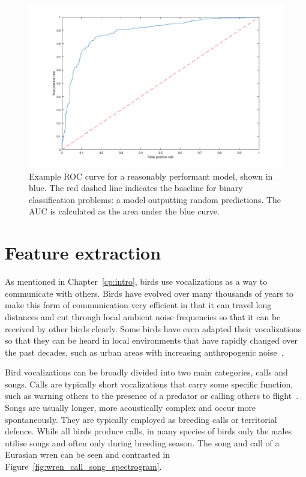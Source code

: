 \begin{figure}[ht]
  \centering
  \includegraphics[width=\textwidth]{figures/roc.png}
  \caption{Example ROC curve for a reasonably performant model, shown in blue.
  The red dashed line indicates the baseline for binary classification problems:
a model outputting random predictions. The AUC is calculated as the area under
the blue curve.}\label{fig:roc}
\end{figure}

\section{Feature extraction}\label{sec:feat_extraction}

As mentioned in Chapter~\ref{cp:intro}, birds use vocalizations as a way to
communicate with others. Birds have evolved over many thousands of years to
make this form of communication very efficient in that it can travel long
distances and cut through local ambient noise frequencies so that it can be
received by other birds clearly. Some birds have even adapted their
vocalizations so that they can be heard in local environments that have rapidly
changed over the past decades, such as urban areas with increasing anthropogenic
noise~\cite{luther2010urban}.

Bird vocalizations can be broadly divided into two main categories, calls and
songs. Calls are typically short vocalizations that carry some specific
function, such as warning others to the presence of a predator or calling others
to flight~\cite{MARLER2004132}. Songs are usually longer, more acoustically
complex and occur more spontaneously. They are typically employed as breeding
calls or territorial defence. While all birds produce calls, in many species of
birds only the males utilise songs and often only during breeding season. The
song and call of a Eurasian wren can be seen and contrasted in
Figure~\ref{fig:wren_call_song_spectrogram}.

